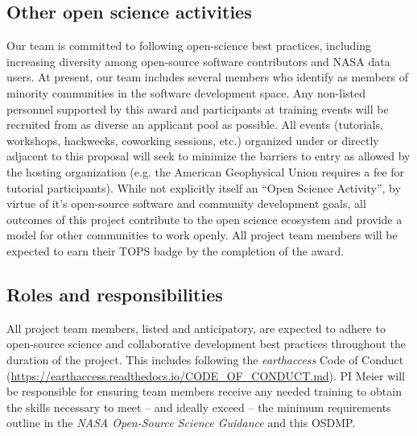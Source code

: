 \subsection{Other open science activities}

Our team is committed to following open-science best practices, including increasing diversity among open-source software contributors and NASA data users. At present, our team includes several members who identify as members of minority communities in the software development space. Any non-listed personnel supported by this award and participants at training events will be recruited from as diverse an applicant pool as possible. All events (tutorials, workshops, hackweeks, coworking sessions, etc.) organized under or directly adjacent to this proposal will seek to minimize the barriers to entry as allowed by the hosting organization (e.g. the American Geophysical Union requires a fee for tutorial participants). While not explicitly itself an ``Open Science Activity'', by virtue of it's open-source software and community development goals, all outcomes of this project contribute to the open science ecosystem and provide a model for other communities to work openly. All project team members will be expected to earn their TOPS badge by the completion of the award.



\subsection{Roles and responsibilities}

All project team members, listed and anticipatory, are expected to adhere to open-source science and collaborative development best practices throughout the duration of the project. This includes following the \textit{earthaccess} Code of Conduct (\url{https://earthaccess.readthedocs.io/CODE_OF_CONDUCT.md}). PI Meier will be responsible for ensuring team members receive any needed training to obtain the skills necessary to meet -- and ideally exceed -- the minimum requirements outline in the \textit{NASA Open-Source Science Guidance} and this OSDMP.

